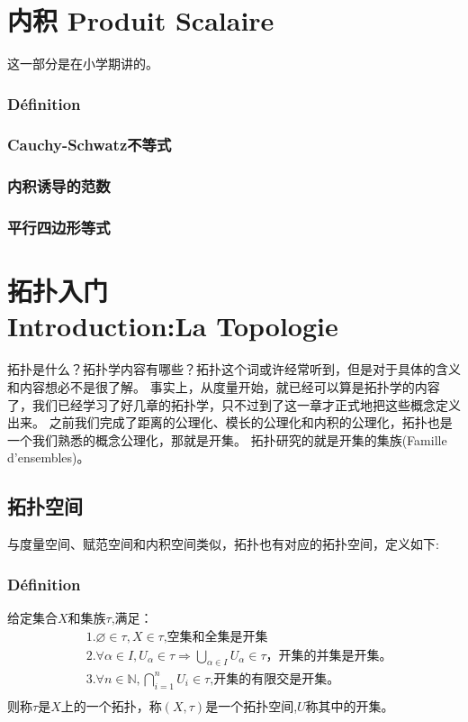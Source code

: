\documentclass[12pt, a4paper, oneside]{ctexbook}
\begin{document}
\chapter{内积 Produit Scalaire}
  这一部分是在小学期讲的。
    \subsection{Définition}
    \subsection{Cauchy-Schwatz不等式}
    \subsection{内积诱导的范数}
    \subsection{平行四边形等式}


\chapter{拓扑入门\\Introduction:La Topologie}
拓扑是什么？拓扑学内容有哪些？拓扑这个词或许经常听到，但是对于具体的含义和内容想必不是很了解。
事实上，从度量开始，就已经可以算是拓扑学的内容了，我们已经学习了好几章的拓扑学，只不过到了这一章才正式地把这些概念定义出来。
之前我们完成了距离的公理化、模长的公理化和内积的公理化，拓扑也是一个我们熟悉的概念公理化，那就是开集。
拓扑研究的就是开集的集族(Famille d'ensembles)。
\section{拓扑空间}
  与度量空间、赋范空间和内积空间类似，拓扑也有对应的拓扑空间，定义如下:
  \subsection{Définition}
  给定集合$X$和集族$\tau $,满足：
  $$
  \begin{aligned}&
  1.\varnothing\in\tau , X\in\tau\text{,空集和全集是开集}\\&
  2.\forall\alpha\in I,U_\alpha\in\tau \Rightarrow\bigcup_{\alpha\in I}U_\alpha\in\tau \text{，开集的并集是开集。}\\&
  3.\forall n\in\mathbb{N},\bigcap_{i=1}^{n}U_i\in\tau \text{,开集的有限交是开集。}\\
    \end{aligned}
  $$
  则称$\tau $是$X$上的一个拓扑，称$(X,\tau)$是一个拓扑空间,$U$称其中的开集。
\end{document}
